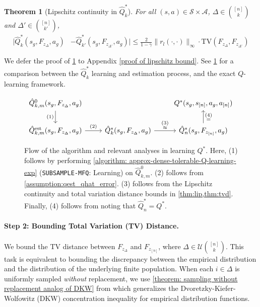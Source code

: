 \documentclass{article}
\theoremstyle{plain}
\newtheorem{theorem}{Theorem}[section]
\theoremstyle{definition}
\def\est{\mathrm{est}}
\begin{document}
\begin{theorem}[Lipschitz continuity in $\hat{Q}_k^*$]\label{thm:lip}
 For all $(s, a) \in\mathcal{S}\times\mathcal{A}$, $\Delta\in\binom{[n]}{k}$ and $\Delta'\in\binom{[n]}{k'}$, \begin{align*}|\hat{Q}^*_k(s_g,F_{z_\Delta},a_g) &- \hat{Q}^*_{k'}(s_g, F_{z_{\Delta'}}, a_g)|  \leq \frac{2}{1-\gamma}\|r_l(\cdot,\cdot)\|_\infty \cdot \mathrm{TV}\left(F_{z_\Delta}, F_{z_{\Delta'}}\right)
\end{align*}
\end{theorem}
We defer the proof of \cref{thm:lip} to Appendix \ref{proof of lipschitz bound}. See \cref{figure: algorithm/analysis flow}
for a comparison between the $\hat{Q}_k^*$ learning and estimation process, and the exact ${Q}$-learning framework.
\begin{figure}[ht]
\[ \begin{tikzcd}
\hat{Q}^0_{k,m}(s_g,F_{z_{\Delta}},a_g) \arrow[swap]{d}{\substack{(1)}}& & Q^*(s_g, s_{[n]}, a_g, a_{[n]})\\%
\hat{Q}_{k,m}^\est(s_g, F_{z_{\Delta}}, a_g) \arrow{r}{\substack{(2)}} & \hat{Q}_k^*(s_g, F_{z_\Delta}, a_g)\arrow{r}{\substack{(3)\\ \approx}} & \hat{Q}_n^*(s_g, F_{z_{[n]}}, a_g)\arrow[swap]{u}{\substack{(4)\\=}}
\end{tikzcd}
\]
\caption{Flow of the algorithm and relevant analyses in learning $Q^*$. Here, (1) follows by performing \cref{algorithm: approx-dense-tolerable-Q-learning-exp} (\texttt{SUBSAMPLE-MFQ}: Learning) on $\hat{Q}_{k,m}^0$. (2) follows from \cref{assumption:qest_qhat_error}. (3) follows from the Lipschitz continuity and total variation distance bounds in \cref{thm:lip,thm:tvd}. Finally, (4) follows from noting that $\hat{Q}_n^* = Q^*$. 
}\label{figure: algorithm/analysis flow}
\end{figure}
\paragraph{Step 2: Bounding Total Variation (TV) Distance.} We bound the TV distance between $F_{z_\Delta}$ and $F_{z_{[n]}}$, where $\Delta\!\in\!\mathcal{U}\binom{[n]}{k}$. This task is equivalent to bounding the discrepancy between the empirical distribution and the distribution of the underlying finite population. When each $i\!\in\!\Delta$ is uniformly sampled \emph{without} replacement, we use \cref{theorem: sampling without replacement analog of DKW} from \cite{anand2024efficient} which generalizes the Dvoretzky-Kiefer-Wolfowitz (DKW) concentration inequality for empirical distribution functions. 
\end{document}
